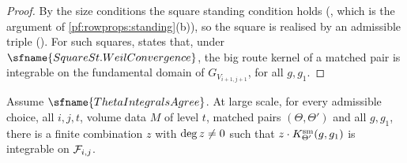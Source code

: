 \begin{proof}
By the size conditions the square standing condition holds (, which is the
argument of \cref{pf:rowprops:standing}(b)), so the square is realised by an admissible triple
(). For such squares,
 states that, under
$\sfname{SquareSt.WeilConvergence}$, the big route kernel of a matched pair is integrable on the fundamental domain of
$G_{V_{i+1,j+1}}$, for all $g,g_1$.
\end{proof}

\begin{lemma}\label{pf:rowprops:smallint}
Assume $\sfname{ThetaIntegralsAgree}$. At large scale, for every admissible choice, all $i,j,t$, volume data $M$ of
level $t$, matched pairs $(\Theta,\Theta')$ and all $g,g_1$, there is a finite combination $z$ with $\deg z\neq0$ such
that $z\cdot K^{\mathrm{sm}}_{\Theta'}(g,g_1)$ is integrable on $\mathcal{F}_{i,j}$.
\end{lemma}

